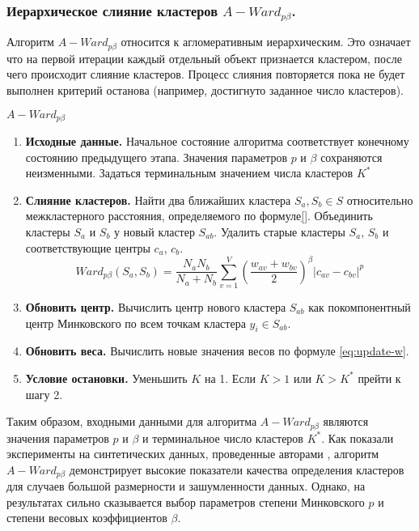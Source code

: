 \documentclass[12pt,twoside,a4paper,tikz,border=5]{refart}
\begin{document}
			\subsubsection{ Иерархическое слияние кластеров $ A-Ward_{p\beta} $.}
			Алгоритм  $ A-Ward_{p\beta} $ относится к агломеративным иерархическим. Это означает что на первой итерации каждый отдельный объект признается кластером, после чего происходит слияние кластеров. Процесс слияния повторяется пока не будет выполнен критерий останова (например, достигнуто заданное число кластеров). 
			\begin{algorithm}{\boldmath$ A-Ward_{p\beta} $ }{}
				\begin{enumerate}
					\item \textbf{Исходные данные.} Начальное состояние алгоритма соответствует конечному состоянию предыдущего этапа. Значения параметров $ p $ и $ \beta $ сохраняются неизменными. Задаться терминальным значением числа кластеров $ K^* $
					\item \textbf{Слияние кластеров.} Найти два ближайших кластера $ S_a,S_b \in S $ относительно межкластерного расстояния, определяемого по формуле\eqref{}. Объединить кластеры $ S_a $ и $ S_b $ у новый кластер $ S_{ab} $. Удалить старые кластеры $ S_a $, $ S_b $ и соответствующие центры $ c_a $, $ c_b $.
					\begin{equation}
						Ward_{p\beta}(S_a,S_b)=\dfrac{N_aN_b}{N_a+N_b}\sum_{v=1}^{V}\left( \dfrac{w_{av}+w_{bv}}{2} \right) ^\beta |c_{av}-c_{bv}|^p
					\end{equation}
					\item \textbf{Обновить центр.} Вычислить центр нового кластера $ S_{ab} $ как покомпонентный центр Минковского по всем точкам кластера $ y_i \in S_{ab} $.
					\item \textbf{Обновить веса.} Вычислить новые значения весов по формуле \eqref{eq:update-w}.
					\item \textbf{Условие остановки.} Уменьшить $ K $ на 1. Если $ K>1 $ или $ K>K^* $ прейти к шагу 2.
				\end{enumerate}
			\end{algorithm}
			Таким образом, входными данными для алгоритма $ A-Ward_{p\beta} $ являются значения параметров $ p $ и $ \beta $ и терминальное число кластеров $ K^* $. Как показали эксперименты на синтетических данных, проведенные авторами \cite{a-ward-pb}, алгоритм  $ A-Ward_{p\beta} $ демонстрирует высокие показатели качества определения кластеров для случаев большой размерности и зашумленности данных. Однако, на результатах сильно сказывается выбор параметров степени Минковского $ p $ и степени весовых коэффициентов $ \beta $.
\end{document}

